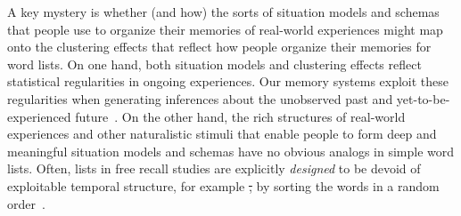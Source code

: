 \documentclass[11pt]{article}
\providecommand{\DIFdeltex}[1]{{\protect\color{red}\sout{#1}}}                      %
\providecommand{\DIFdelbegin}{} %
\providecommand{\DIFdelend}{} %
\providecommand{\DIFdel}[1]{\texorpdfstring{\DIFdeltex{#1}}{}} %
\newcommand{\DIFscaledelfig}{0.5}
\newlength{\DIFdelgraphicswidth} %
\newlength{\DIFdelgraphicsheight} %
\newcommand{\DIFdelincludegraphics}[2][]{%
\sbox{\DIFdelgraphicsbox}{\DIFOincludegraphics[#1]{#2}}%
\settoboxwidth{\DIFdelgraphicswidth}{\DIFdelgraphicsbox} %
\settoboxtotalheight{\DIFdelgraphicsheight}{\DIFdelgraphicsbox} %
\scalebox{\DIFscaledelfig}{%
\parbox[b]{\DIFdelgraphicswidth}{\usebox{\DIFdelgraphicsbox}\\[-\baselineskip] \rule{\DIFdelgraphicswidth}{0em}}\llap{\resizebox{\DIFdelgraphicswidth}{\DIFdelgraphicsheight}{%
\setlength{\unitlength}{\DIFdelgraphicswidth}%
\begin{picture}(1,1)%
\thicklines\linethickness{2pt} %
{\color[rgb]{1,0,0}\put(0,0){\framebox(1,1){}}}%
{\color[rgb]{1,0,0}\put(0,0){\line( 1,1){1}}}%
{\color[rgb]{1,0,0}\put(0,1){\line(1,-1){1}}}%
\end{picture}%
}\hspace*{3pt}}} %
} %
\DeclareRobustCommand{\DIFdelbegin}{\DIFOdelbegin \let\includegraphics\DIFdelincludegraphics} %
\DeclareRobustCommand{\DIFdelend}{\DIFOaddend \let\includegraphics\DIFOincludegraphics} %
\begin{document}
A key mystery is whether (and how) the sorts of situation models and schemas
that people use to organize their memories of real-world experiences might map
onto the clustering effects that reflect how people organize their memories for
word lists. On one hand, both situation models and clustering effects reflect
statistical regularities in ongoing experiences. Our memory systems exploit
these regularities when generating inferences about the unobserved past and
yet-to-be-experienced future~\citep{XuEtal23, SchaTurk15, RangRitc12,
BoweEtal79, MomeEtal17}. On the other hand, the rich structures of real-world
experiences and other naturalistic stimuli that enable people to form deep and
meaningful situation models and schemas have no obvious analogs in simple word
lists. Often, lists in free recall studies are explicitly \textit{designed} to
be devoid of exploitable temporal structure, for example \DIFdelbegin \DIFdel{, }\DIFdelend by sorting the words
in a random order~\citep{Kaha12}.
\end{document}
